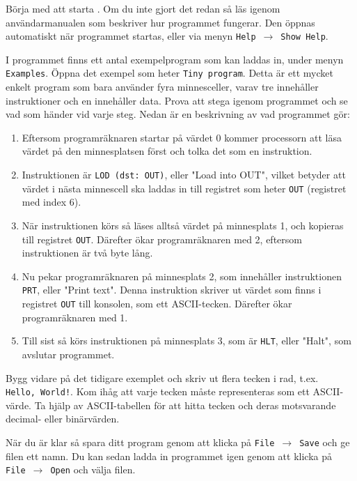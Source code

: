 \begin{Datorarbete}
    \item Börja med att starta \progname{}. Om du inte gjort det redan så läs igenom användarmanualen som beskriver hur programmet fungerar. Den öppnas automatiskt när programmet startas, eller via menyn \texttt{Help}~$\rightarrow$~\texttt{Show Help}.

    \item I programmet finns ett antal exempelprogram som kan laddas in, under menyn \texttt{Examples}. Öppna det exempel som heter \texttt{Tiny program}. Detta är ett mycket enkelt program som bara använder fyra minnesceller, varav tre innehåller instruktioner och en innehåller data. Prova att stega igenom programmet och se vad som händer vid varje steg. Nedan är en beskrivning av vad programmet gör:
    \begin{enumerate}
        \item Eftersom programräknaren startar på värdet 0 kommer processorn att läsa värdet på den minnesplatsen först och tolka det som en instruktion.
        \item Instruktionen är \texttt{LOD (dst: OUT)}, eller "Load into OUT", vilket betyder att värdet i nästa minnescell ska laddas in till registret som heter \texttt{OUT} (registret med index 6).
        \item När instruktionen körs så läses alltså värdet på minnesplats 1, och kopieras till registret \texttt{OUT}. Därefter ökar programräknaren med 2, eftersom instruktionen är två byte lång.
        \item Nu pekar programräknaren på minnesplats 2, som innehåller instruktionen \texttt{PRT}, eller "Print text". Denna instruktion skriver ut värdet som finns i registret \texttt{OUT} till konsolen, som ett ASCII-tecken. Därefter ökar programräknaren med 1.
        \item Till sist så körs instruktionen på minnesplats 3, som är \texttt{HLT}, eller "Halt", som avslutar programmet.
    \end{enumerate}

    \item Bygg vidare på det tidigare exemplet och skriv ut flera tecken i rad, t.ex. \texttt{Hello,~World!}. Kom ihåg att varje tecken måste representeras som ett ASCII-värde. Ta hjälp av ASCII-tabellen för att hitta tecken och deras motsvarande decimal- eller binärvärden.

    \noindent När du är klar så spara ditt program genom att klicka på \texttt{File}~$\rightarrow$~\texttt{Save} och ge filen ett namn. Du kan sedan ladda in programmet igen genom att klicka på \texttt{File}~$\rightarrow$~\texttt{Open} och välja filen.


\end{Datorarbete}
